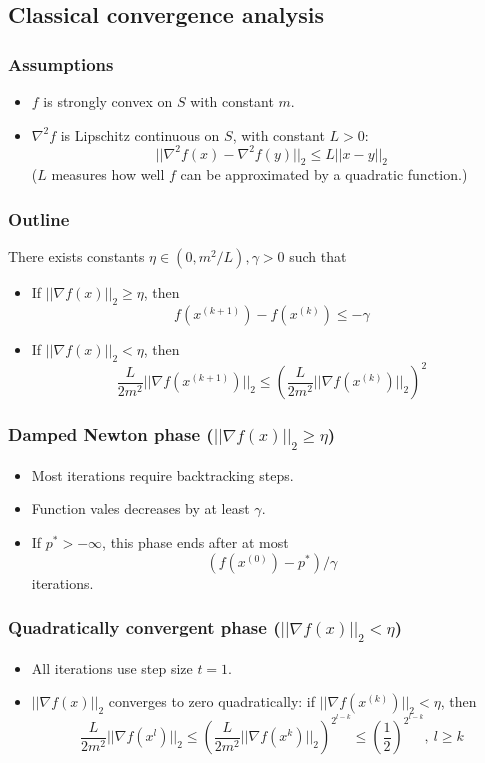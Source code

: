 \subsection{Classical convergence analysis}
\subsubsection{Assumptions}
\begin{itemize}
    \item $f$ is strongly convex on $S$ with constant $m$.
    \item $\nabla^2 f$ is Lipschitz continuous on $S$, with constant $L > 0$:
    $$
    ||\nabla^2 f(x) - \nabla^2 f(y)||_2 \le L||x - y||_2
    $$
    ($L$ measures how well $f$ can be approximated by a quadratic function.)
\end{itemize}

\subsubsection{Outline}
There exists constants $\eta \in (0, m^2/L), \gamma > 0$ such that
\begin{itemize}
    \item If $||\nabla f(x)||_2 \ge \eta$, then 
    $$
    f(x^{(k + 1)}) - f(x^{(k)}) \le - \gamma
    $$
    \item If $||\nabla f(x)||_2 < \eta$, then
    $$
    \frac{L}{2m^2} ||\nabla f(x^{(k + 1)})||_2 \le (\frac{L}{2m^2}||\nabla f(x^{(k)})||_2)^2
    $$
\end{itemize}

\subsubsection{Damped Newton phase ($||\nabla f(x)||_2 \ge \eta$)}
\begin{itemize}
    \item Most iterations require backtracking steps.
    \item Function vales decreases by at least $\gamma$.
    \item If $p^* > - \infty$, this phase ends after at most 
    $$
    (f(x^{(0)}) - p^*) / \gamma
    $$
    iterations.
\end{itemize}

\subsubsection{Quadratically convergent phase ($||\nabla f(x)||_2 < \eta$)}
\begin{itemize}
    \item All iterations use step size $t = 1$.
    \item $||\nabla f(x)||_2$ converges to zero quadratically: if $||\nabla f(x^{(k)})||_2 < \eta$, then
    $$
    \frac{L}{2m^2}||\nabla f(x^l)||_2 \le (\frac{L}{2m^2}||\nabla f(x^{k})||_2)^{2^{l - k}} \le (\frac{1}{2})^{2^{l - k}}, \ l \ge k
    $$
\end{itemize}

